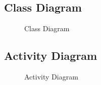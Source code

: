 \newpage

\subsection{Class Diagram}
\begin{figure}[htbp]
	\centering
	\caption{Class Diagram}
	\label{fig:Class_Diagram}
\end{figure}

\newpage

\subsection{Activity Diagram}
\begin{figure}[htbp]
	\centering
	\caption{Activity Diagram}
	\label{fig:Activity_Diagram}
\end{figure}